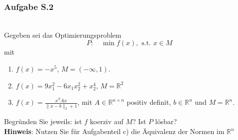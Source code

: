 \documentclass[12pt]{extreport} %
\newcommand{\R}{\mathbb{R}}
\theoremstyle{named}
\theoremstyle{nnamed}
\theoremstyle{itshape}
\theoremstyle{normal}
\begin{document}
\newpage

\subsubsection{Aufgabe S.2} ~\\
Gegeben sei das Optimierungsproblem
$$ P: \quad \min f(x), \text{ s.t. } x \in M $$
mit
\begin{enumerate}
	\item $f(x) = - x^5$, $M =(- \infty, 1)$.
	\item $f(x) = 9 x_1^2 - 6 x_1 x_2^2 + x_2^4$, $M = \R^2$
	\item $f(x) = \frac{x^T A x}{\| x - b\|_2 + 1}$, mit $A \in \R^{n \times n}$ positiv definit, $b \in \R^n$ und $M = \R^n$.
\end{enumerate}
	Begründen Sie jeweils: ist $f$ koerziv auf $M$? Ist $P$ lösbar? ~\\
	\textbf{Hinweis}: Nutzen Sie für Aufgabenteil c) die Äquivalenz der Normen im $\R^n$ ~\bigskip
\end{document}
